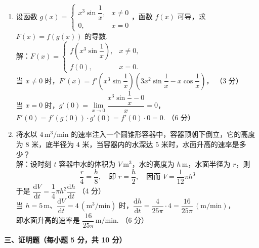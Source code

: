 \documentclass[a4paper,11pt]{ctexart}
\newcommand{\dd}{\mathrm{d}}
\newcommand{\score}[1]{\hfill（#1）}
\begin{document}
\begin{enumerate}[label=\arabic*., start=11, leftmargin=2em, itemsep=1.0em, topsep=0.5em]
  \item 设函数 $g(x) = \begin{cases} x^3 \sin\dfrac{1}{x}, & x\neq 0 \\[0.4em] 0, & x = 0 \end{cases}$，函数 $f(x)$ 可导，求 $F(x) = f(g(x))$ 的导数.\\[0.3em]
  解：$F(x) = \begin{cases} f\!\left(x^3\sin\dfrac{1}{x}\right), & x\neq 0, \\[0.4em] f(0), & x = 0. \end{cases}$\\[0.3em]
  当 $x\neq 0$ 时，$F'(x) = f'\!\left(x^3\sin\dfrac{1}{x}\right)\left(3x^2\sin\dfrac{1}{x} - x\cos\dfrac{1}{x}\right)$， \score{3 分}\\[0.4em]
  当 $x = 0$ 时，$g'(0) = \lim\limits_{x\to 0}\dfrac{x^3\sin\dfrac{1}{x} - 0}{x} = 0$，$F'(0) = f'(g(0))\cdot g'(0) = f'(0)\cdot 0 = 0$. \score{6 分}

  \item 将水以 $4\,\mathrm{m}^3/\mathrm{min}$ 的速率注入一个圆锥形容器中，容器顶朝下倒立，它的高度为 $8$ 米，底半径为 $4$ 米，当容器内的水深达 $5$ 米时，水面升高的速率是多少？\\[0.3em]
  解：设时刻 $t$ 容器中水的体积为 $V\,\mathrm{m}^3$，水的高度为 $h\,\mathrm{m}$，水面半径为 $r$，则
  \[
    \frac{r}{4} = \frac{h}{8},\quad\text{即 } r = \frac{h}{2},\quad\text{因而 } V = \frac{1}{12}\pi h^3 \tag*{（2 分）}
  \]
  于是 $\dfrac{\dd V}{\dd t} = \dfrac{1}{4}\pi h^2\dfrac{\dd h}{\dd t}$ \score{4 分}\\[0.3em]
  当 $h = 5\,\mathrm{m}$、$\dfrac{\dd V}{\dd t} = 4\,(\mathrm{m}^3/\mathrm{min})$ 时，$\dfrac{\dd h}{\dd t} = \dfrac{4}{25\pi}\cdot 4 = \dfrac{16}{25\pi}\,(\mathrm{m/min})$，\\[0.3em]
  即水面升高的速率是 $\dfrac{16}{25\pi}\,\mathrm{m/min}$. \score{6 分}
\end{enumerate}

\vspace{0.8em}

\textbf{三、证明题（每小题 5 分，共 10 分）}
\end{document}
